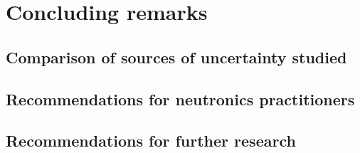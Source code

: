 
\chapter{Concluding remarks} %

\ifpdf
    \graphicspath{{Chapter4/Figs/Raster/}{Chapter4/Figs/PDF/}{Chapter4/Figs/}}
\else
    \graphicspath{{Chapter4/Figs/Vector/}{Chapter4/Figs/}}
\fi


\section{Comparison of sources of uncertainty studied}

\section{Recommendations for neutronics practitioners}

\section{Recommendations for further research}

